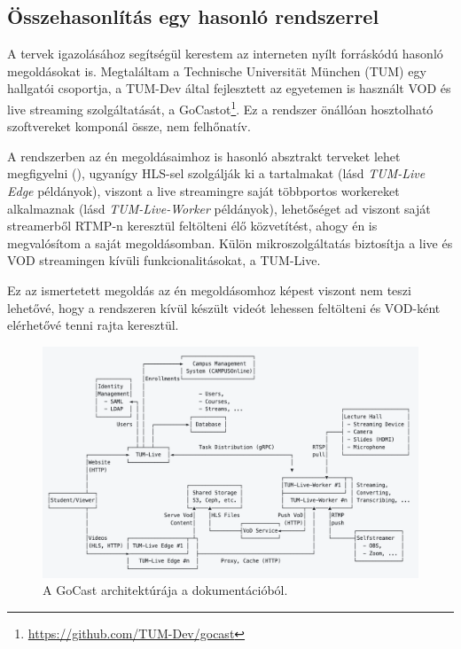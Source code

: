\subsection{Összehasonlítás egy hasonló rendszerrel}

A tervek igazolásához segítségül kerestem az interneten nyílt forráskódú hasonló megoldásokat is. Megtaláltam a Technische Universität München (TUM) egy hallgatói csoportja, a TUM-Dev által fejlesztett az egyetemen is használt VOD és live streaming szolgáltatását, a GoCastot\footnote{\url{https://github.com/TUM-Dev/gocast}}. Ez a rendszer önállóan hosztolható szoftvereket komponál össze, nem felhőnatív.

A rendszerben az én megoldásaimhoz is hasonló absztrakt terveket lehet megfigyelni (), ugyanígy HLS-sel szolgálják ki a tartalmakat (lásd \emph{TUM-Live Edge} példányok), viszont a live streamingre saját többportos workereket alkalmaznak (lásd \emph{TUM-Live-Worker} példányok), lehetőséget ad viszont saját streamerből RTMP-n keresztül feltölteni élő közvetítést, ahogy én is megvalósítom a saját megoldásomban. Külön mikroszolgáltatás biztosítja a live és VOD streamingen kívüli funkcionalitásokat, a TUM\leavevmode\hbox{-}Live.

Ez az ismertetett megoldás az én megoldásomhoz képest viszont nem teszi lehetővé, hogy a rendszeren kívül készült videót lehessen feltölteni és VOD-ként elérhetővé tenni rajta keresztül.

\begin{figure}[h]
	\centering
	\includegraphics[width=150mm, keepaspectratio]{figures/gocast.png}
	\caption{A GoCast architektúrája a dokumentációból.}
	\label{fig:gocast}
\end{figure}

